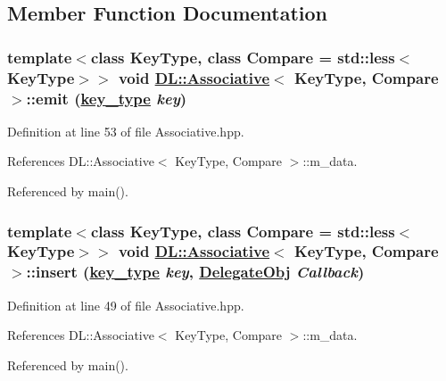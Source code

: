 \subsection{Member Function Documentation}
\hypertarget{classDL_1_1Associative_a3}{
\subsubsection[emit]{\setlength{\rightskip}{0pt plus 5cm}template$<$class Key\-Type, class Compare = std::less$<$Key\-Type$>$$>$ void \hyperlink{classDL_1_1Associative}{DL::Associative}$<$ Key\-Type, Compare $>$::emit (\hyperlink{classDL_1_1Associative_w1}{key\_\-type} {\em key})}}
\label{classDL_1_1Associative_a3}




Definition at line 53 of file Associative.hpp.

References DL::Associative$<$ Key\-Type, Compare $>$::m\_\-data.

Referenced by main().\hypertarget{classDL_1_1Associative_a2}{
\subsubsection[insert]{\setlength{\rightskip}{0pt plus 5cm}template$<$class Key\-Type, class Compare = std::less$<$Key\-Type$>$$>$ void \hyperlink{classDL_1_1Associative}{DL::Associative}$<$ Key\-Type, Compare $>$::insert (\hyperlink{classDL_1_1Associative_w1}{key\_\-type} {\em key}, \hyperlink{namespaceDL_a0}{Delegate\-Obj} {\em Callback})}}
\label{classDL_1_1Associative_a2}




Definition at line 49 of file Associative.hpp.

References DL::Associative$<$ Key\-Type, Compare $>$::m\_\-data.

Referenced by main().

